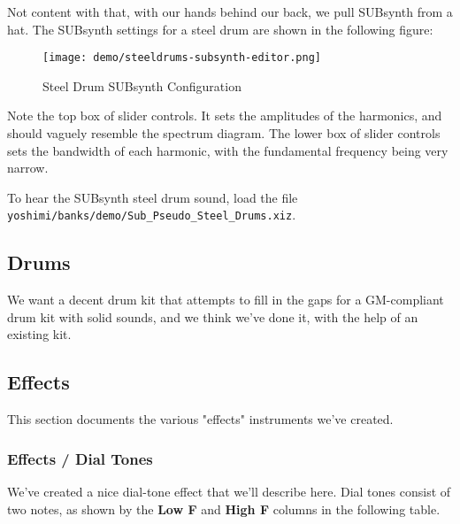    Not content with that, with our hands behind our back, we pull
   SUBsynth from a hat.  The SUBsynth settings for a steel drum are shown in
   the following figure:

\begin{figure}[H]
   \centering 
   \texttt{[image: demo/steeldrums-subsynth-editor.png]}
   \caption{Steel Drum SUBsynth Configuration}
   \label{fig:cookbook_bank_steeldrum_subsynth}
\end{figure}

   Note the top box of slider controls.  It sets the amplitudes of
   the harmonics, and should vaguely resemble the spectrum diagram.
   The lower box of slider controls sets the bandwidth of each harmonic,
   with the fundamental frequency being very narrow.

   To hear the SUBsynth steel drum sound, load the file
   \texttt{yoshimi/banks/demo/Sub\_Pseudo\_Steel\_Drums.xiz}.

\subsection{Drums}
\label{subsec:cookbook_instruments_drums}

   We want a decent drum kit that attempts to fill in the gaps for a
   GM-compliant drum kit with solid sounds, and we think we've done it, with
   the help of an existing kit.


\subsection{Effects}
\label{subsec:cookbook_instruments_effects}

   This section documents the various "effects" instruments we've created.

\subsubsection{Effects / Dial Tones}
\label{subsubsec:cookbook_instruments_effects_dialtones}

   We've created a nice dial-tone effect that we'll describe here.
   Dial tones consist of two notes, as shown by the
   \textbf{Low F} and \textbf{High F} columns in the following table.

